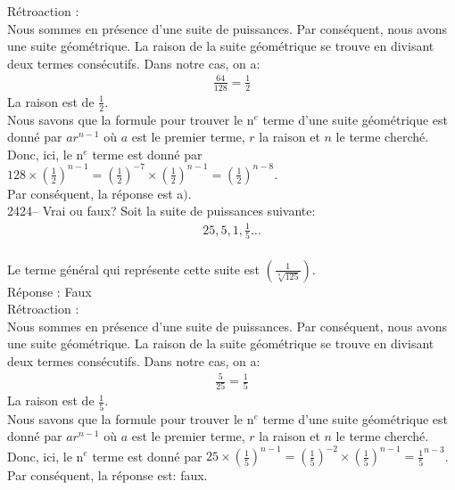\documentclass[letterpaper, 12pt]{article}
\begin{document}
R\'etroaction :\\
Nous sommes en pr\'esence d'une suite de puissances. Par cons\'equent, nous avons une suite g\'eom\'etrique. La raison de la suite g\'eom\'etrique se trouve en divisant deux termes cons\'ecutifs. Dans notre cas, on a:
\begin{eqnarray*}
 \frac{64}{128}=\frac{1}{2}
\end{eqnarray*}
La raison est de $\frac{1}{2}$.\\
Nous savons que la formule pour trouver le n$^{e}$ terme d'une suite g\'eom\'etrique est donn\'e par $ar^{n-1}$ o\`u $a$ est le premier terme, $r$ la raison et $n$ le terme cherch\'e. Donc, ici, le n$^{e}$ terme est donn\'e par $128\times \left(  \frac{1}{2}\right) ^{n-1}=\left( \frac{1}{2}\right) ^{-7}\times\left( \frac{1}{2}\right) ^{n-1}=\left( \frac{1}{2}\right) ^{n-8}$.\\
Par cons\'equent, la r\'eponse est a$)$.\\

2424-- Vrai ou faux? Soit la suite de puissances suivante:\\
\begin{eqnarray*}
25, 5, 1, \frac{1}{5} \ldots
\end{eqnarray*}\\
Le terme g\'en\'eral qui repr\'esente cette suite est $\left( \frac{1}{\sqrt[n]{125}}\right)$.\\

R\'eponse : Faux\\

R\'etroaction :\\
Nous sommes en pr\'esence d'une suite de puissances. Par cons\'equent, nous avons une suite g\'eom\'etrique. La raison de la suite g\'eom\'etrique se trouve en divisant deux termes cons\'ecutifs. Dans notre cas, on a:
\begin{eqnarray*}
 \frac{5}{ 25}=\frac{1}{5}
\end{eqnarray*}
La raison est de $\frac{1}{5}$.\\
Nous savons que la formule pour trouver le n$^{e}$ terme d'une suite g\'eom\'etrique est donn\'e par $ar^{n-1}$ o\`u $a$ est le premier terme, $r$ la raison et $n$ le terme cherch\'e. Donc, ici, le n$^{e}$ terme est donn\'e par $25\times \left( \frac{1}{5}\right) ^{n-1}=\left( \frac{1}{5}\right) ^{-2}\times \left( \frac{1}{5}\right) ^{n-1}=\frac{1}{5}^{n-3}$.\\
Par cons\'equent, la r\'eponse est: faux.\\
\end{document}
